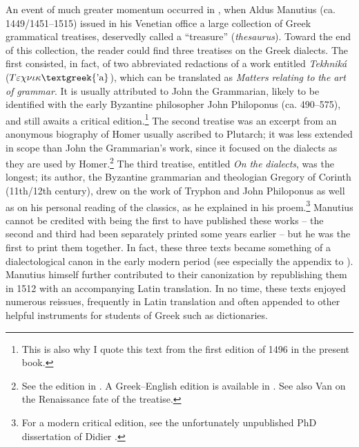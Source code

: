 An event of much greater momentum occurred in \citealt{August1496}, when Aldus Manutius (ca. 1449/1451–1515) issued in his Venetian office a large collection of Greek grammatical treatises, deservedly called a “treasure” (\textit{thesaurus}). Toward the end of this collection, the reader could find three treatises on the Greek dialects. The first consisted, in fact, of two abbreviated redactions of a work entitled \textit{Tekhniká} ($T\varepsilon \chi \nu \iota \kappa \text{\textgreek{'a}}$), which can be translated as \textit{Matters} \textit{relating} \textit{to} \textit{the} \textit{art} \textit{of} \textit{grammar}. It is usually attributed to John the Grammarian, likely to be identified with the early Byzantine philosopher John Philoponus (ca. 490–575), and still awaits a critical edition.\footnote{This is also why I quote this text from the first edition of 1496 in the present book.} The second treatise was an excerpt from an anonymous biography of Homer usually ascribed to Plutarch; it was less extended in scope than John the Grammarian’s work, since it focused on the dialects as they are used by Homer.\footnote{See the edition in \citet{Kindstrand1990}. A Greek–English edition is available in \citet{KeaneyLamberton1996}. See also Van \citet{Rooy2018c} on the Renaissance fate of the treatise.} The third treatise, entitled \textit{On} \textit{the} \textit{dialects}, was the longest; its author, the Byzantine grammarian and theologian Gregory of Corinth (11th/12th century), drew on the work of Tryphon and John Philoponus as well as on his personal reading of the classics, as he explained in his proem.\footnote{For a modern critical edition, see the unfortunately unpublished PhD dissertation of Didier \citet{Xhardez1991}.} Manutius cannot be credited with being the first to have published these works – the second and third had been separately printed some years earlier – but he was the first to print them together. In fact, these three texts became something of a dialectological canon in the early modern period (see especially the appendix to \citealt{Trovato1984}). Manutius himself further contributed to their canonization by republishing them in 1512 with an accompanying Latin translation. In no time, these texts enjoyed numerous reissues, frequently in Latin translation and often appended to other helpful instruments for students of Greek such as dictionaries.

